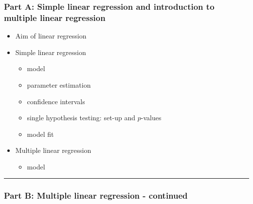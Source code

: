 \documentclass[]{article}
\providecommand{\tightlist}{%
  \setlength{\itemsep}{0pt}\setlength{\parskip}{0pt}}
\begin{document}
\hypertarget{part-a-simple-linear-regression-and-introduction-to-multiple-linear-regression}{%
\subsubsection{Part A: Simple linear regression and introduction to
multiple linear
regression}\label{part-a-simple-linear-regression-and-introduction-to-multiple-linear-regression}}

\begin{itemize}
\tightlist
\item
  Aim of linear regression
\item
  Simple linear regression

  \begin{itemize}
  \tightlist
  \item
    model
  \item
    parameter estimation
  \item
    confidence intervals
  \item
    single hypothesis testing: set-up and \(p\)-values
  \item
    model fit
  \end{itemize}
\item
  Multiple linear regression

  \begin{itemize}
  \tightlist
  \item
    model
  \end{itemize}
\end{itemize}

\begin{center}\rule{0.5\linewidth}{\linethickness}\end{center}

\hypertarget{part-b-multiple-linear-regression---continued}{%
\subsubsection{Part B: Multiple linear regression -
continued}\label{part-b-multiple-linear-regression---continued}}
\end{document}

